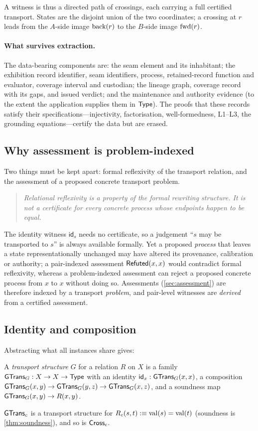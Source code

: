 A witness is thus a directed path of crossings, each carrying a full certified transport. States are the disjoint union of the two coordinates; a crossing at $r$ leads from the $A$-side image $\mathrm{back}(r)$ to the $B$-side image $\mathrm{fwd}(r)$.

\paragraph{What survives extraction.}
The data-bearing components are: the seam element and its inhabitant; the exhibition record identifier, seam identifiers, process, retained-record function and evaluator, coverage interval and custodian; the lineage graph, coverage record with its gaps, and issued verdict; and the maintenance and authority evidence (to the extent the application supplies them in $\mathsf{Type}$). The proofs that these records satisfy their specifications---injectivity, factorisation, well-formedness, L1--L3, the grounding equations---certify the data but are erased.

\subsection{Why assessment is problem-indexed}\label{sec:indexed}
Two things must be kept apart: formal reflexivity of the transport relation, and the assessment of a proposed concrete transport problem.
\begin{quote}
\emph{Relational reflexivity is a property of the formal rewriting structure. It is not a certificate for every concrete process whose endpoints happen to be equal.}
\end{quote}
The identity witness $\mathsf{id}_s$ needs no certificate, so a judgement ``$s$ may be transported to $s$'' is always available formally. Yet a proposed \emph{process} that leaves a state representationally unchanged may have altered its provenance, calibration or authority; a pair-indexed assessment $\mathsf{Refuted}(x,x)$ would contradict formal reflexivity, whereas a problem-indexed assessment can reject a proposed concrete process from $x$ to $x$ without doing so. Assessments (\cref{sec:assessment}) are therefore indexed by a transport \emph{problem}, and pair-level witnesses are \emph{derived} from a certified assessment.

\subsection{Identity and composition}\label{sec:laws}
Abstracting what all instances share gives:
\begin{defi}\label{def:structure}
A \emph{transport structure} $G$ for a relation $R$ on $X$ is a family $\mathsf{GTrans}_G : X \to X \to \mathsf{Type}$ with an identity $\mathsf{id}_x : \mathsf{GTrans}_G(x,x)$, a composition $\mathsf{GTrans}_G(x,y) \to \mathsf{GTrans}_G(y,z) \to \mathsf{GTrans}_G(x,z)$, and a soundness map $\mathsf{GTrans}_G(x,y) \to R(x,y)$.
\end{defi}
$\mathsf{GTrans}_c$ is a transport structure for $R_c(s,t) :\equiv \mathrm{val}(s) = \mathrm{val}(t)$ (soundness is \cref{thm:soundness}), and so is $\mathsf{Cross}_c$.

